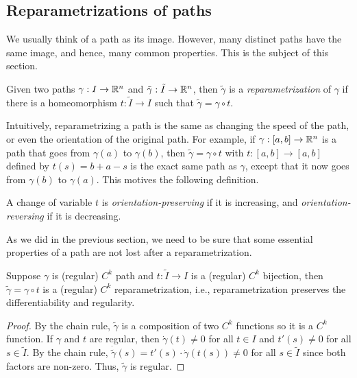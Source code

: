 \subsection{Reparametrizations of paths}

We usually think of a path as its image. However, many distinct paths have the same image, and hence, many common properties. This is the subject of this section. 

\begin{definition}
    Given two paths $\gamma : I \to \mathbb{R}^n$ and $\tilde{\gamma} : \tilde{I} \to \mathbb{R}^n$, then $\tilde{\gamma}$ is a \textit{reparametrization} of $\gamma$ if there is a homeomorphism $t : \tilde{I} \to I$ such that $\tilde{\gamma} = \gamma \circ t$.
\end{definition}

Intuitively, reparametrizing a path is the same as changing the speed of the path, or even the orientation of the original path. For example, if $\gamma : [a,b] \to \mathbb{R}^n$ is a path that goes from $\gamma(a)$ to $\gamma(b)$, then $\tilde{\gamma} = \gamma \circ t$ with $t : [a,b] \to [a,b]$ defined by $t(s) = b+a - s$ is the exact same path as $\gamma$, except that it now goes from $\gamma(b)$ to $\gamma(a)$. This motives the following definition.

\begin{definition}
    A change of variable $t$ is \textit{orientation-preserving} if it is increasing, and \textit{orientation-reversing} if it is decreasing.
\end{definition}

As we did in the previous section, we need to be sure that some essential properties of a path are not lost after a reparametrization.

\begin{proposition}
    Suppose $\gamma$ is (regular) $C^k$ path and $t : \tilde{I} \to I$ is a (regular) $C^k$ bijection, then $\tilde{\gamma} = \gamma \circ t$ is a (regular) $C^k$ reparametrization, i.e., reparametrization preserves the differentiability and regularity.
\end{proposition}

\begin{proof}
    By the chain rule, $\tilde{\gamma}$ is a composition of two $C^k$ functions so it is a $C^k$ function. If $\gamma$ and $t$ are regular, then $\dot{\gamma}(t) \neq 0$ for all $t \in I$ and $t'(s) \neq 0$ for all $s \in \tilde{I}$. By the chain rule, $\dot{\tilde{\gamma}}(s) = t'(s)\cdot \dot{\gamma}(t(s)) \neq 0$ for all $s\in \tilde{I}$ since both factors are non-zero. Thus, $\tilde{\gamma}$ is regular.
\end{proof}

